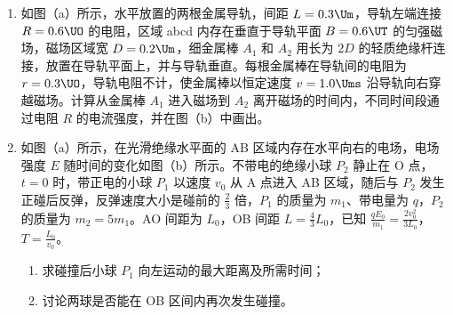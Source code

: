 \documentclass[\gkver]{gaokaozhenti}
\begin{document}
\begin{enumerate}
\item
如图（a）所示，水平放置的两根金属导轨，间距 $L=0.3\Um$，导轨左端连接 $R=0.6\UO$ 的电阻，区域 abcd 内存在垂直于导轨平面 $B=0.6\UT$ 的匀强磁场，磁场区域宽 $D=0.2\Um$，细金属棒 $A_{1}$ 和 $A_{2}$ 用长为 $2D$ 的轻质绝缘杆连接，放置在导轨平面上，并与导轨垂直。每根金属棒在导轨间的电阻为 $r=0.3\UO$，导轨电阻不计，使金属棒以恒定速度 $v=1.0\Ums$ 沿导轨向右穿越磁场。计算从金属棒 $A_{1}$ 进入磁场到 $A_{2}$ 离开磁场的时间内，不同时间段通过电阻 $R$ 的电流强度，并在图（b）中画出。




\item
如图（a）所示，在光滑绝缘水平面的 AB 区域内存在水平向右的电场，电场强度 $E$ 随时间的变化如图（b）所示。不带电的绝缘小球 $P_{2}$ 静止在 O 点，$t=0$ 时，带正电的小球 $P_{1}$ 以速度 $v_{0}$ 从 A 点进入 AB 区域，随后与 $P_{2}$ 发生正碰后反弹，反弹速度大小是碰前的 $\frac{2}{3}$ 倍，$P_{1}$ 的质量为 $m_{1}$、带电量为 $q$，$P_{2}$ 的质量为 $m_{2}=5m_{1}$。AO 间距为 $L_{0}$，OB 间距 $L=\frac{4}{3}L_{0}$，已知 $\frac{qE_{0}}{m_{1}}=\frac{2v_{0}^{2}}{3L_{0}}$，$T=\frac{L_{0}}{v_{0}}$。

\begin{enumerate}
	\item
	求碰撞后小球 $P_{1}$ 向左运动的最大距离及所需时间；
	\item
	讨论两球是否能在 OB 区间内再次发生碰撞。
\end{enumerate}


\end{enumerate}
\end{document}
